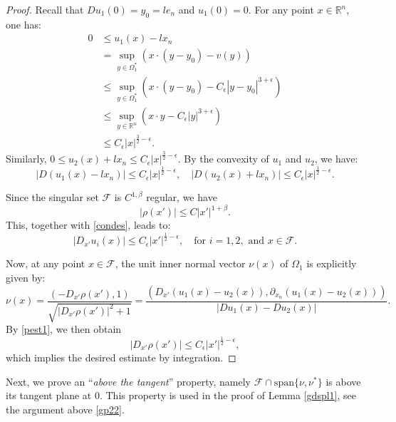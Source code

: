 \documentclass[11pt]{amsart}
\theoremstyle{plain}
\newcommand{\0}{\textbf{0}}
\numberwithin{equation}{section}
\numberwithin{equation}{section}
\numberwithin{figure}{section}
\begin{document}
\begin{proof}
Recall that \( Du_1(0)=y_0=l e_n \) and \( u_1(0)=0 \). For any point \( x \in \mathbb{R}^n \), one has:
\begin{align*}
0 &\leq u_1(x) - l x_n \\
  &= \sup_{y \in \Omega_1^*} \left( x \cdot (y - y_0) - v(y) \right) \\
  &\leq \sup_{y \in \Omega_1^*} \left( x \cdot (y - y_0) - C_\epsilon |y - y_0|^{3 + \epsilon} \right) \\
  &\leq \sup_{y \in \mathbb{R}^n} \left( x \cdot y - C_\epsilon |y|^{3 + \epsilon} \right) \\
  &\leq C_\epsilon |x|^{\frac{3}{2} - \epsilon}.
\end{align*}
Similarly, \( 0 \leq u_2(x) + lx_n \leq C_\epsilon |x|^{\frac{3}{2} - \epsilon} \).
By the convexity of \( u_1 \) and \( u_2 \),
we have:
\begin{equation}\label{condes}
|D(u_1(x) - l x_n)| \leq C_\epsilon |x|^{\frac{1}{2} - \epsilon}, \quad |D(u_2(x) + lx_n)| \leq C_\epsilon |x|^{\frac{1}{2} - \epsilon}.
\end{equation}

Since the singular set $\mathcal{F}$ is $C^{1,\beta}$ regular, we have
\begin{equation}
|\rho(x')| \leq C |x'|^{1 + \beta}.
\end{equation}
This, together with \eqref{condes}, leads to:
\begin{equation}\label{pest1}
|D_{x'}u_i(x)| \leq C_\epsilon |x'|^{\frac{1}{2} - \epsilon}, \quad \text{for } i = 1, 2, \text{ and } x \in \mathcal{F}.
\end{equation}

Now, at any point $x \in \mathcal{F}$, the unit inner normal vector $\nu(x)$ of $\Omega_1$ is explicitly given by:
\begin{equation}
\nu(x) = \frac{(-D_{x'}\rho(x'), 1)}{\sqrt{|D_{x'}\rho(x')|^2 + 1}} = \frac{\left(D_{x'}(u_1(x) - u_2(x)), \partial_{x_n}(u_1(x) - u_2(x))\right)}{|Du_1(x) - Du_2(x)|}.
\end{equation}
By \eqref{pest1}, we then obtain
\begin{equation}
|D_{x'}\rho(x')| \leq C_\epsilon |x'|^{\frac{1}{2} - \epsilon},
\end{equation}
which implies the desired estimate by integration. 
\end{proof}


Next, we prove an ``\emph{above the tangent}'' property, namely \(\mathcal{F}\cap\text{span}\{\nu, \nu^*\}\) is  above its tangent plane at \(0.\) This property is  used in the proof 
of Lemma \ref{gdspl1}, see the argument above \eqref{gp22}.
\end{document}
